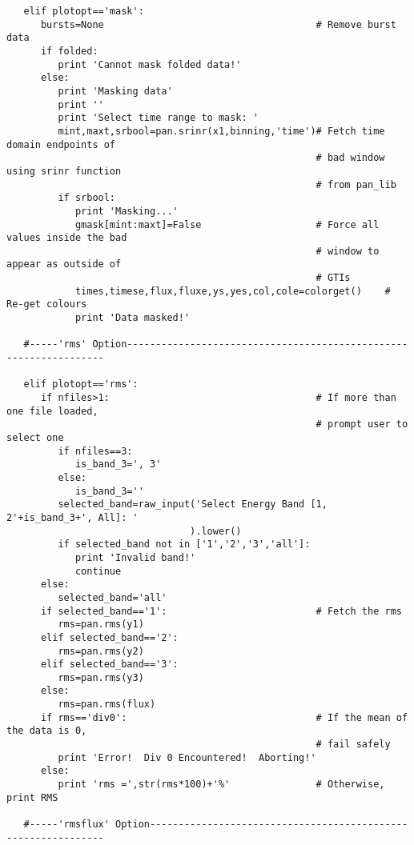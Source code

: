 \begin{verbatim}
   elif plotopt=='mask':
      bursts=None                                     # Remove burst data
      if folded:
         print 'Cannot mask folded data!'
      else:
         print 'Masking data'
         print ''
         print 'Select time range to mask: '
         mint,maxt,srbool=pan.srinr(x1,binning,'time')# Fetch time domain endpoints of
                                                      # bad window using srinr function
                                                      # from pan_lib
         if srbool:
            print 'Masking...'
            gmask[mint:maxt]=False                    # Force all values inside the bad
                                                      # window to appear as outside of
                                                      # GTIs
            times,timese,flux,fluxe,ys,yes,col,cole=colorget()    # Re-get colours
            print 'Data masked!'

   #-----'rms' Option------------------------------------------------------------------

   elif plotopt=='rms':
      if nfiles>1:                                    # If more than one file loaded,
                                                      # prompt user to select one
         if nfiles==3:
            is_band_3=', 3'
         else:
            is_band_3=''
         selected_band=raw_input('Select Energy Band [1, 2'+is_band_3+', All]: '
                                ).lower()
         if selected_band not in ['1','2','3','all']:
            print 'Invalid band!'
            continue
      else:
         selected_band='all'
      if selected_band=='1':                          # Fetch the rms
         rms=pan.rms(y1)
      elif selected_band=='2':
         rms=pan.rms(y2)
      elif selected_band=='3':
         rms=pan.rms(y3)
      else:
         rms=pan.rms(flux)
      if rms=='div0':                                 # If the mean of the data is 0,
                                                      # fail safely
         print 'Error!  Div 0 Encountered!  Aborting!'
      else:
         print 'rms =',str(rms*100)+'%'               # Otherwise, print RMS

   #-----'rmsflux' Option--------------------------------------------------------------


\end{verbatim}
